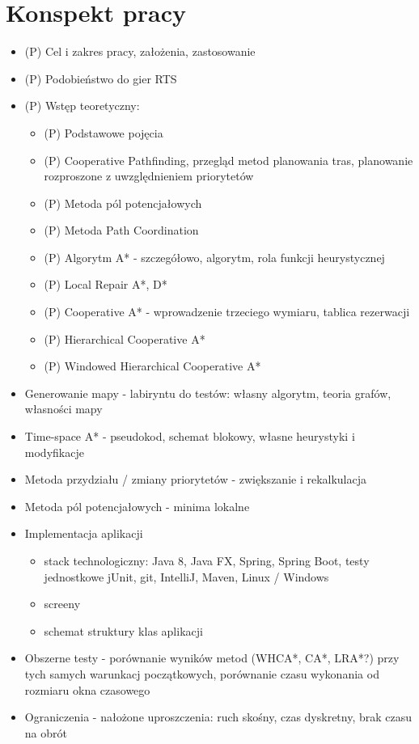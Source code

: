 \chapter{Konspekt pracy}
\label{ch:konspekt}
\begin{itemize}
	\item (P) Cel i zakres pracy, założenia, zastosowanie
	\item (P) Podobieństwo do gier RTS
	\item (P) Wstęp teoretyczny:
	\begin{itemize}
		\item (P) Podstawowe pojęcia
		\item (P) Cooperative Pathfinding, przegląd metod planowania tras, planowanie rozproszone z uwzględnieniem priorytetów
		\item (P) Metoda pól potencjałowych
		\item (P) Metoda Path Coordination
		\item (P) Algorytm A* - szczegółowo, algorytm, rola funkcji heurystycznej
		\item (P) Local Repair A*, D*
		\item (P) Cooperative A* - wprowadzenie trzeciego wymiaru, tablica rezerwacji
		\item (P) Hierarchical Cooperative A*
		\item (P) Windowed Hierarchical Cooperative A*
	\end{itemize}
	\item Generowanie mapy - labiryntu do testów: własny algorytm, teoria grafów, własności mapy
	\item Time-space A* - pseudokod, schemat blokowy, własne heurystyki i modyfikacje
	\item Metoda przydziału / zmiany priorytetów - zwiększanie i rekalkulacja
	\item Metoda pól potencjałowych - minima lokalne
	\item Implementacja aplikacji
	\begin{itemize}
		\item stack technologiczny: Java 8, Java FX, Spring, Spring Boot, testy jednostkowe jUnit, git, IntelliJ, Maven, Linux / Windows
		\item screeny
		\item schemat struktury klas aplikacji
	\end{itemize}
	\item Obszerne testy - porównanie wyników metod (WHCA*, CA*, LRA*?) przy tych samych warunkacj początkowych, porównanie czasu wykonania od rozmiaru okna czasowego
	\item Ograniczenia - nałożone uproszczenia: ruch skośny, czas dyskretny, brak czasu na obrót
\end{itemize}